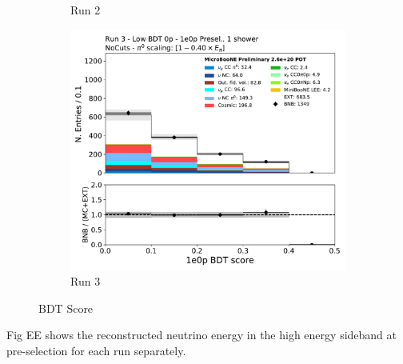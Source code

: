 \begin{figure}[H]
\begin{subfigure}{0.3\textwidth}
    \caption{Run 2}
    \end{subfigure}
    \begin{subfigure}{0.3\textwidth}
    \includegraphics[width=1.0\textwidth]{1e0p/Low_BDT_Sideband/run3/bkg_score_low_bdt.pdf}
    \caption{Run 3}
    \end{subfigure}
    \caption{BDT Score} 
    \label{fig:low_0pbdt_sideband_plots}
\end{figure}

Fig EE shows the reconstructed neutrino energy in the high energy sideband at pre-selection for each run separately.

